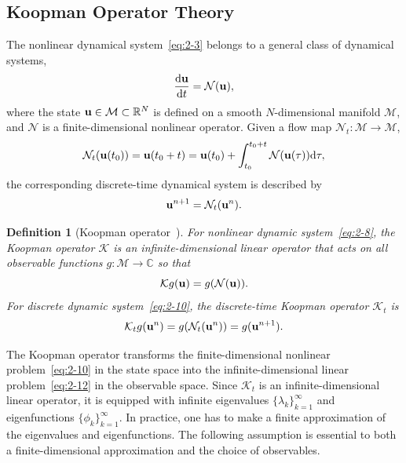 \documentclass[10pt]{article}
\numberwithin{equation}{section}
\theoremstyle{plain}
\newtheorem{definition}{\bf Definition}[section]
\theoremstyle{remark}
\theoremstyle{remark}
\begin{document}
\subsection{Koopman Operator Theory}
\label{sec:dmd_koopman}
The nonlinear dynamical system~\cref{eq:2-3} belongs to a general class  of dynamical systems,
\begin{equation}\label{eq:2-8}
\frac{\text d\bold u}{\text dt} = \mathcal N(\bold u),
\end{equation}
where the state $\bold u \in \mathcal M \subset \mathbb R^N$ is defined on a smooth $N$-dimensional manifold $\mathcal M$, and $\mathcal N$ is a finite-dimensional nonlinear operator. Given a flow map $\mathcal N_t :\mathcal M \to \mathcal M$,
\begin{equation}\label{eq:2-9}
\mathcal N_t (\bold u(t_0)) = \bold u(t_0+t) = \bold u(t_0)+\int_{t_0}^{t_0+t} \mathcal N(\bold u(\tau)) \text d \tau,
\end{equation}
the corresponding discrete-time dynamical system is described by
\begin{equation}\label{eq:2-10}
\bold u^{n+1} = \mathcal N_t(\bold u^n).
\end{equation}

\begin{definition}[Koopman operator~\cite{kutzbook}]
For nonlinear dynamic system~\cref{eq:2-8}, the Koopman operator $\mathcal K$ is an infinite-dimensional linear operator that acts on all observable functions $g: \mathcal M\to \mathbb C$ so that
\begin{equation}\label{eq:2-11}
\mathcal K g(\bold u) = g(\mathcal N(\bold u)).
\end{equation}
For discrete dynamic system~\cref{eq:2-10}, the discrete-time Koopman operator $\mathcal K_t$ is 
\begin{equation}\label{eq:2-12}
\mathcal K_t g(\bold u^{n}) = g(\mathcal N_t(\bold u^n)) = g(\bold u^{n+1}).
\end{equation}
\end{definition}
The Koopman operator transforms the finite-dimensional nonlinear problem~\cref{eq:2-10} in the state space into the infinite-dimensional linear problem~\cref{eq:2-12} in the observable space. Since $\mathcal K_t$ is an infinite-dimensional linear operator, it is equipped with infinite eigenvalues $\{\lambda_k\}_{k=1}^{\infty}$ and eigenfunctions $\{\phi_k\}_{k=1}^\infty$. In practice, one has to make a finite approximation of the eigenvalues and eigenfunctions. The following assumption is essential to both a finite-dimensional approximation and the choice of observables.
\end{document}
